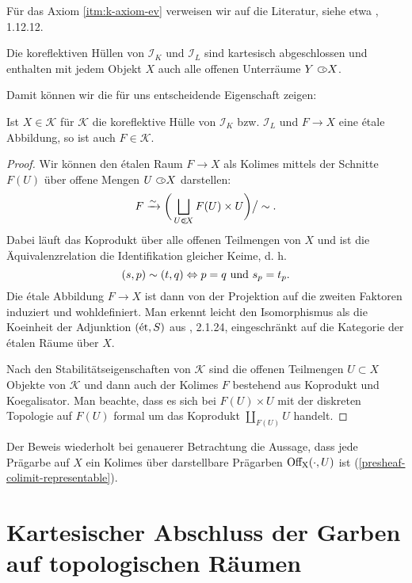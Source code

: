 Für das Axiom \ref{itm:k-axiom-ev} verweisen wir auf die Literatur,
siehe etwa \cite{TM}, 1.12.12.

\begin{kor}
  Die koreflektiven Hüllen von $\mathcal{I}_K$ und $\mathcal{I}_L$
  sind kartesisch abgeschlossen und enthalten mit jedem Objekt $X$
  auch alle offenen Unterräume $Y \subset\kern-0.58em\circ X$.
\end{kor}

Damit können wir die für uns entscheidende Eigenschaft zeigen:
\begin{prop} \label{k-etale-closed}
  Ist $X \in \mathcal{K}$ für $\mathcal{K}$ die koreflektive Hülle von
  $\mathcal{I}_K$ bzw. $\mathcal{I}_L$ und $F \to X$ eine étale
  Abbildung, so ist auch $F \in \mathcal{K}$.
\end{prop}
\begin{proof}
  Wir können den étalen Raum $F \to X$ als Kolimes mittels der
  Schnitte $F(U)$ über offene Mengen $U \subset\kern-0.58em\circ X$ darstellen:
  \[ F \xrightarrow[]{\sim} \bigg( \bigsqcup_{U \subset\kern-0.58em\circ X} F(U) \times U \bigg) \big/ \sim. \]
  Dabei läuft das Koprodukt über alle offenen Teilmengen von $X$ und
  ist die Äquivalenzrelation die Identifikation gleicher Keime, d. h.
  \[ (s, p) \sim (t, q) \Leftrightarrow p = q \text{ und } s_p = t_p. \]
  Die étale Abbildung $F \to X$ ist dann von der Projektion auf die
  zweiten Faktoren induziert und wohldefiniert. Man erkennt leicht den
  Isomorphismus als die Koeinheit der Adjunktion $(\mathrm{\acute{e}t}, S)$ aus
  \cite{TG}, 2.1.24, eingeschränkt auf die Kategorie der étalen Räume
  über $X$.

  Nach den Stabilitätseigenschaften von $\mathcal{K}$ sind die offenen
  Teilmengen $U \subset X$ Objekte von $\mathcal{K}$ und dann auch der
  Kolimes $F$ bestehend aus Koprodukt und Koegalisator. Man beachte,
  dass es sich bei $F(U) \times U$ mit der diskreten Topologie auf
  $F(U)$ formal um das Koprodukt $\coprod_{F(U)} U$ handelt.
\end{proof}
\begin{bem}
  Der Beweis wiederholt bei genauerer Betrachtung die Aussage, dass
  jede Prägarbe auf $X$ ein Kolimes über darstellbare Prägarben
  $\operatorname{Off_X}(\cdot, U)$ ist (\ref{presheaf-colimit-representable}).
\end{bem}

\section{Kartesischer Abschluss der Garben auf topologischen Räumen}
\label{sec:enstop-cart-closed}


